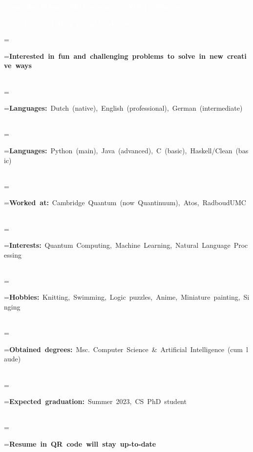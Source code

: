 \documentclass[8pt]{article}
\newcommand*{\vcenteredhbox}[1]{\begingroup
\setbox0=\hbox{#1}\parbox{\wd0}{\box0}\endgroup}
\newcommand{\icons}{svg/}	%
\newcommand{\icon}[2]{\colorbox{secondcol}{}}	%
\newcommand{\icontext}[4]{ 						%
	\vcenteredhbox{\icon{#1}{#2}}\hspace{#4} \vcenteredhbox{\textcolor{textcol}{#3}}
}
\begin{document}
\begin{center}
\hspace{-6pt}
	\colorbox{thirdcol}{\hspace{15pt}\small{\textcolor{white}{\textbf{Computer Science PhD researcher, NISQ Software}}\hspace{9pt}}}
\end{center}
\newpage
        \begin{center}
            \colorbox{maincol}{\textcolor{white}{\hspace{9pt}\uppercase{\textbf{Too long; Didn't Remember}}\hspace{9pt}}}
        \end{center}
        \ssmall
        \begin{flushleft}
            \vspace{-5pt}
            \icontext{}{5pt}{\textcolor{fourthcol}{\textbf{Interested in fun and challenging problems to solve in new creative ways}}}{3pt}\\[1pt]
            \icontext{}{5pt}{\textcolor{fourthcol}{\textbf{Languages:}} Dutch (native), English (professional), German (intermediate)}{3pt}\\[1pt]
            \icontext{}{5pt}{\textcolor{fourthcol}{\textbf{Languages:}} Python (main), Java (advanced), C (basic), Haskell/Clean (basic)}{3pt}\\[1pt]
            \icontext{}{5pt}{\textcolor{fourthcol}{\textbf{Worked at:}} Cambridge Quantum (now Quantinuum), Atos, RadboudUMC}{3pt}\\[1pt]
            \icontext{}{5pt}{\textcolor{fourthcol}{\textbf{Interests:}} Quantum Computing, Machine Learning, Natural Language Processing}{3pt}\\[1pt]
            \icontext{}{5pt}{\textcolor{fourthcol}{\textbf{Hobbies:}} Knitting, Swimming, Logic puzzles, Anime, Miniature painting, Singing}{3pt}\\[1pt]
            \icontext{}{5pt}{\textcolor{fourthcol}{\textbf{Obtained degrees:}} Msc. Computer Science \& Artificial Intelligence (cum laude)}{3pt}\\[1pt]
            \icontext{}{5pt}{\textcolor{fourthcol}{\textbf{Expected graduation:}} Summer 2023, CS PhD student}{3pt}\\[1pt]
            \icontext{}{5pt}{\textcolor{fourthcol}{\textbf{Resume in QR code will stay up-to-date}} }{3pt}
        \end{flushleft}
\end{document}

